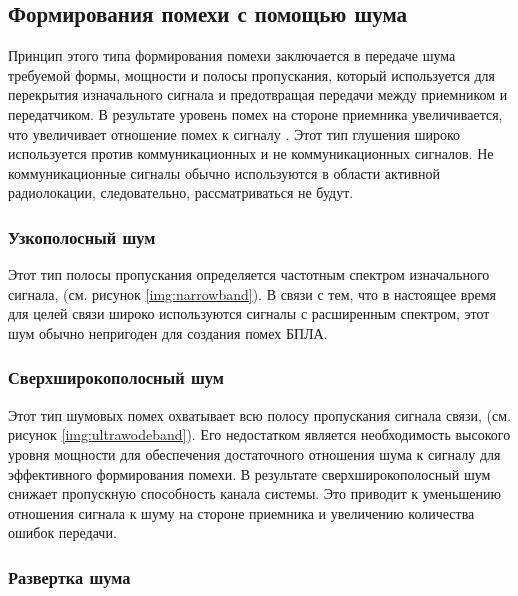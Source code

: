 \subsection{Формирования помехи с помощью шума}

Принцип этого типа формирования помехи заключается в передаче шума требуемой формы, мощности и полосы пропускания, который используется для перекрытия изначального сигнала и предотвращая передачи между приемником и передатчиком. В результате уровень помех на стороне приемника увеличивается, что увеличивает отношение помех к сигналу \cite{signaltointer}. Этот тип глушения широко используется против коммуникационных и не коммуникационных сигналов. Не коммуникационные сигналы обычно используются в области активной радиолокации, следовательно, рассматриваться не будут.

\subsubsection{Узкополосный шум}

Этот тип полосы пропускания определяется частотным спектром изначального сигнала, (см. рисунок \ref{img:narrowband}). В связи с тем, что в настоящее время для целей связи широко используются сигналы с расширенным спектром, этот шум обычно непригоден для создания помех БПЛА.


\FloatBarrier

\subsubsection{Сверхширокополосный шум}

Этот тип шумовых помех охватывает всю полосу пропускания сигнала связи, (см. рисунок \ref{img:ultrawodeband}). Его недостатком является необходимость высокого уровня мощности для обеспечения достаточного отношения шума к сигналу для эффективного формирования помехи. В результате сверхширокополосный шум снижает пропускную способность канала системы. Это приводит к уменьшению отношения сигнала к шуму на стороне приемника и увеличению количества ошибок передачи.


\FloatBarrier

\subsubsection{Развертка шума}
 
